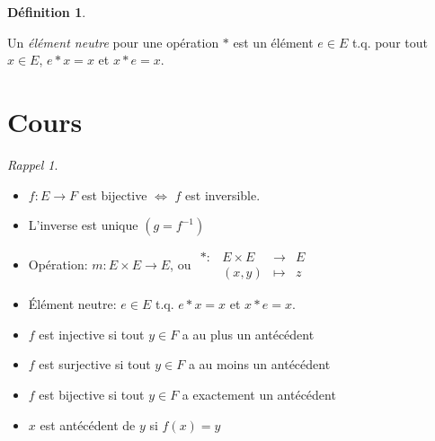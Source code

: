 \documentclass{report}
\newcounter{cours}
\newcommand*{\cours}{\section*{Cours \thecours}\stepcounter{cours}}
\theoremstyle{definition}
\newtheorem*{defin}{D\'efinition}
\theoremstyle{remark}
\newtheorem*{rappel}{Rappel}
\begin{document}
	\begin{defin}~

		Un \emph{\'el\'ement neutre} pour une op\'eration $*$ est un \'el\'ement $e \in E$ t.q. pour tout $x \in E$, $e*x=x$ et $x*e=x$.
	\end{defin}

	\cours
	\begin{rappel}
		~

		\begin{itemize}[noitemsep]
			\item $f:E \to F$ est bijective $\Leftrightarrow$ $f$ est inversible.
			\item L'inverse est unique $(g=f^{-1})$
			\item Op\'eration: $m:E \times E \to E$, ou
			$\begin{array}{rrcl}
				*:&E \times E&\to&E\\
				&(x,y)&\mapsto&z
			\end{array}$
			\item \'El\'ement neutre: $e \in E$ t.q. $e*x=x$ et $x*e=x$.
			\item $f$ est injective si tout $y \in F$ a au plus un ant\'ec\'edent
			\item $f$ est surjective si tout $y \in F$ a au moins un ant\'ec\'edent
			\item $f$ est bijective si tout $y \in F$ a exactement un ant\'ec\'edent
			\item $x$ est ant\'ec\'edent de $y$ si $f(x)=y$
		\end{itemize}
	\end{rappel}
\end{document}
